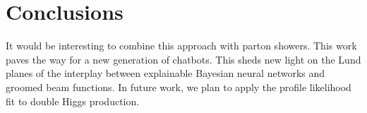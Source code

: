 \section{Conclusions}\label{sec:conclusions}

It would be interesting to combine this approach with parton showers.
This work paves the way for a new generation of chatbots. This sheds new
light on the Lund planes of the interplay between explainable Bayesian
neural networks and groomed beam functions. In future work, we plan to
apply the profile likelihood fit to double Higgs production.

